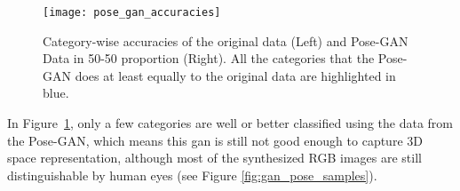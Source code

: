 \begin{figure}[h!]
	\centering
	\texttt{[image: pose\_gan\_accuracies]}
	\caption{Category-wise accuracies of the original data (Left) and Pose-GAN Data in
		50-50 proportion (Right). All the
	categories that the Pose-GAN does at least equally to the original data are
highlighted in blue.}
	\label{fig:pose_gan_accuracies}
\end{figure}

In Figure~\ref{fig:pose_gan_accuracies}, only a few categories are well or better
classified using the data from the Pose-GAN, which means this \acrshort{gan} is still not
good enough to capture 3D space representation, although most of the synthesized RGB
images are still distinguishable by human eyes (see Figure \ref{fig:gan_pose_samples}).

